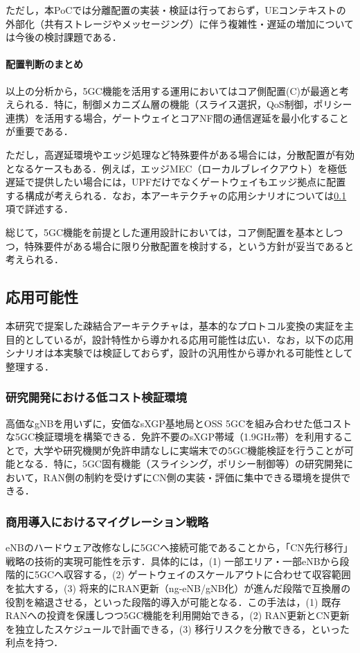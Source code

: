 ただし，本PoCでは分離配置の実装・検証は行っておらず，UEコンテキストの外部化（共有ストレージやメッセージング）に伴う複雑性・遅延の増加については今後の検討課題である．

\paragraph{配置判断のまとめ}
以上の分析から，5GC機能を活用する運用においてはコア側配置(C)が最適と考えられる．特に，制御メカニズム層の機能（スライス選択，QoS制御，ポリシー連携）を活用する場合，ゲートウェイとコアNF間の通信遅延を最小化することが重要である．

ただし，高遅延環境やエッジ処理など特殊要件がある場合には，分散配置が有効となるケースもある．例えば，エッジMEC（ローカルブレイクアウト）を極低遅延で提供したい場合には，UPFだけでなくゲートウェイもエッジ拠点に配置する構成が考えられる．なお，本アーキテクチャの応用シナリオについては\ref{subsec:application}項で詳述する．

総じて，5GC機能を前提とした運用設計においては，コア側配置を基本としつつ，特殊要件がある場合に限り分散配置を検討する，という方針が妥当であると考えられる．

\subsection{応用可能性}
\label{subsec:application}
本研究で提案した疎結合アーキテクチャは，基本的なプロトコル変換の実証を主目的としているが，設計特性から導かれる応用可能性は広い．なお，以下の応用シナリオは本実験では検証しておらず，設計の汎用性から導かれる可能性として整理する．

\subsubsection{研究開発における低コスト検証環境}
高価なgNBを用いずに，安価なsXGP基地局とOSS 5GCを組み合わせた低コストな5GC検証環境を構築できる．免許不要のsXGP帯域（1.9GHz帯）を利用することで，大学や研究機関が免許申請なしに実端末での5GC機能検証を行うことが可能となる．特に，5GC固有機能（スライシング，ポリシー制御等）の研究開発において，RAN側の制約を受けずにCN側の実装・評価に集中できる環境を提供できる．

\subsubsection{商用導入におけるマイグレーション戦略}
\label{subsubsec:migration}
eNBのハードウェア改修なしに5GCへ接続可能であることから，「CN先行移行」戦略の技術的実現可能性を示す．具体的には，(1) 一部エリア・一部eNBから段階的に5GCへ収容する，(2) ゲートウェイのスケールアウトに合わせて収容範囲を拡大する，(3) 将来的にRAN更新（ng-eNB/gNB化）が進んだ段階で互換層の役割を縮退させる，といった段階的導入が可能となる．この手法は，(1) 既存RANへの投資を保護しつつ5GC機能を利用開始できる，(2) RAN更新とCN更新を独立したスケジュールで計画できる，(3) 移行リスクを分散できる，といった利点を持つ．


